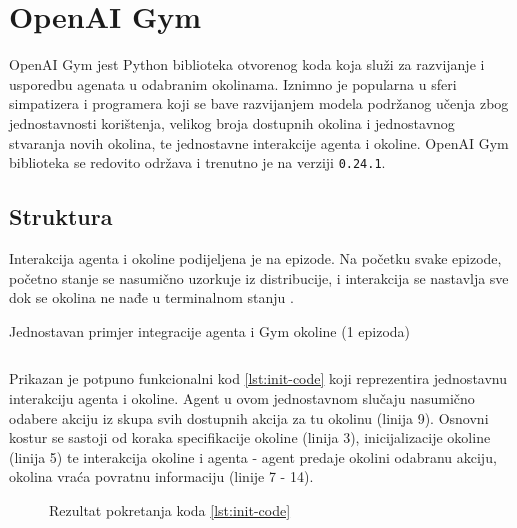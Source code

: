 \chapter{OpenAI Gym}

OpenAI Gym jest Python biblioteka  otvorenog koda  koja služi za razvijanje i usporedbu agenata u odabranim okolinama. Iznimno je popularna u sferi simpatizera i programera koji se bave razvijanjem modela podržanog učenja zbog jednostavnosti korištenja, velikog broja dostupnih okolina i jednostavnog stvaranja novih okolina, te jednostavne interakcije agenta i okoline. OpenAI Gym biblioteka se redovito održava i trenutno je na verziji \texttt{0.24.1}. 

\section{Struktura}

Interakcija agenta i okoline podijeljena je na epizode. Na početku svake epizode, početno stanje se nasumično uzorkuje iz distribucije, i interakcija se nastavlja sve dok se okolina ne nađe u terminalnom stanju \cite{OpenAIWhitepaper}.

\begin{listing}[H]
    \caption{Jednostavan primjer integracije agenta i Gym okoline (1 epizoda)}
    \inputminted{python}{snippets/init.py}
    \label{lst:init-code}
\end{listing}

Prikazan je potpuno funkcionalni kod \ref{lst:init-code} koji reprezentira jednostavnu interakciju agenta i okoline. Agent u ovom jednostavnom slučaju nasumično odabere akciju iz skupa svih dostupnih akcija za tu okolinu (linija 9). Osnovni kostur se sastoji od koraka specifikacije okoline (linija 3), inicijalizacije okoline (linija 5) te interakcija okoline i agenta - agent predaje okolini odabranu akciju, okolina vraća povratnu informaciju (linije 7 - 14). 

\begin{figure}[h]
    \centering
    \caption{Rezultat pokretanja koda \ref{lst:init-code}}
    \label{fig:mountain-car}
\end{figure}


